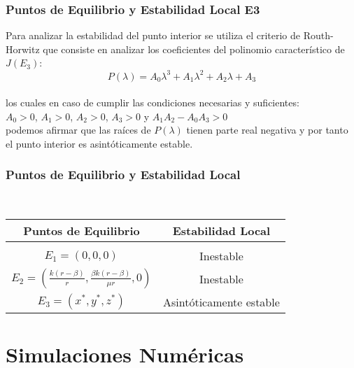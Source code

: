 \documentclass{beamer}
\begin{document}
\begin{frame}
	\frametitle{Puntos de Equilibrio y Estabilidad Local E3}
	\begin{minipage}{10cm}
		Para analizar la estabilidad del punto interior se utiliza el criterio de Routh-Horwitz que consiste en analizar los coeficientes del polinomio característico de $J(E_3)$:\\
		$$P(\lambda) = A_0\lambda^3 + A_1\lambda^2 + A_2\lambda + A_3$$\\
		los cuales en caso de cumplir las condiciones necesarias y suficientes:\\
		$A_0 > 0$, $A_1 > 0$, $A_2 > 0$, $A_3 > 0$ y $A_1 A_2 - A_0 A_3 > 0$\\
		podemos afirmar que las raíces de $P(\lambda)$ tienen parte real negativa y por tanto el punto interior es asint\'oticamente estable.
		
		
		
	\end{minipage}
\end{frame}

\begin{frame}
	\frametitle{Puntos de Equilibrio y Estabilidad Local}
	\begin{minipage}{10cm}
		\

\begin{block}{}
	\begin{center}
	\begin{tabular}{|c|c|}
			\hline
		\textbf{Puntos de Equilibrio} & \textbf{Estabilidad Local}\\
		\hline
		\\
		\addlinespace[-2ex]
		$E_1=(0,0,0)$ & Inestable\\ \hline
		$E_2=(\frac{k(r-\beta)}{r}, \frac{\beta k(r-\beta)}{\mu r}, 0)$ & Inestable\\ \hline  
		$E_3 = (x^*,y^*,z^*)$ & Asint\'oticamente estable 
		 
	\end{tabular}
	\end{center}
\end{block}
	\end{minipage}
\end{frame}



\section{Simulaciones Num\'ericas}
\end{document}
